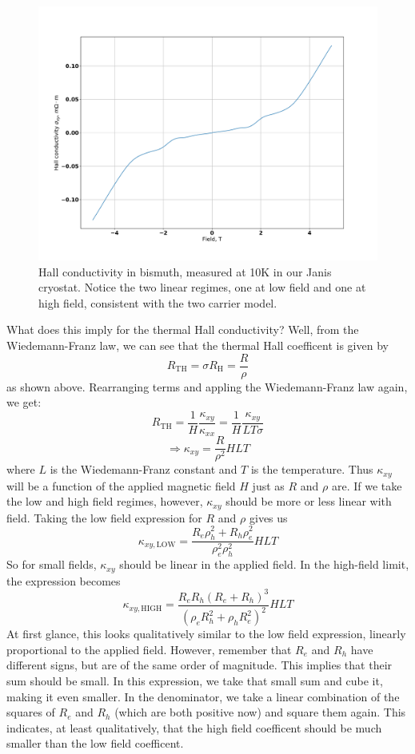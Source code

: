 \documentclass{thesis-umich}
\begin{document}
\begin{figure}
	\caption[Hall conductivity in bismuth]{Hall conductivity in bismuth, measured at 10K in our Janis cryostat. Notice the two linear regimes, one at low field and one at high field, consistent with the two carrier model.}
	\label{fig:bismuth_hall}
	\includegraphics[width=\columnwidth]{figures/BiHallEffect.pdf}
\end{figure}

What does this imply for the thermal Hall conductivity? Well, from the Wiedemann-Franz law, we can see that the thermal Hall coefficent is given by
\[ R_{\mathrm{TH}} = \sigma R_{\mathrm{H}} = \frac{R}{\rho}\]
as shown above. Rearranging terms and appling the Wiedemann-Franz law again, we get:
\[ R_{\mathrm{TH}} = \frac{1}{H}\frac{\kappa_{xy}}{\kappa_{xx}} = \frac{1}{H}\frac{\kappa_{xy}}{LT\sigma}\]
\[ \Rightarrow \kappa_{xy} = \frac{R}{\rho^2}HLT \]
where $L$ is the Wiedemann-Franz constant and $T$ is the temperature. Thus $\kappa_{xy}$ will be a function of the applied magnetic field $H$ just as $R$ and $\rho$ are. If we take the low and high field regimes, however, $\kappa_{xy}$ should be more or less linear with field. Taking the low field expression for $R$ and $\rho$ gives us
\[ \kappa_{xy,\mathrm{LOW}} = \frac{R_e\rho_h^2 + R_h \rho_e^2}{\rho_e^2 \rho_h^2} HLT \]
So for small fields, $\kappa_{xy}$ should be linear in the applied field. In the high-field limit, the expression becomes
\[ \kappa_{xy,\mathrm{HIGH}} = \frac{R_e R_h (R_e + R_h)^3}{(\rho_e R_h^2 + \rho_h R_e^2)^2} HLT \]
At first glance, this looks qualitatively similar to the low field expression, linearly proportional to the applied field. However, remember that $R_e$ and $R_h$ have different signs, but are of the same order of magnitude. This implies that their sum should be small. In this expression, we take that small sum and cube it, making it even smaller. In the denominator, we take a linear combination of the squares of $R_e$ and $R_h$ (which are both positive now) and square them again. This indicates, at least qualitatively, that the high field coefficent should be much smaller than the low field coefficent.
\end{document}
